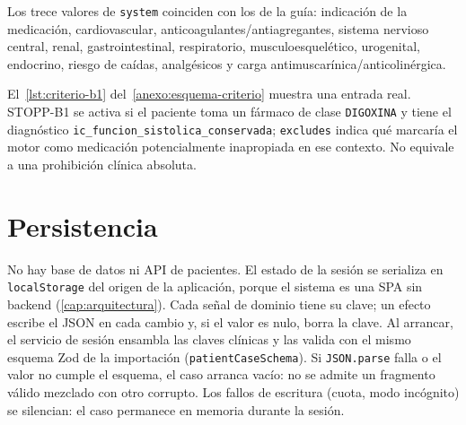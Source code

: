 Los trece valores de \texttt{system} coinciden con los de la guía: indicación
de la medicación, cardiovascular, anticoagulantes/antiagregantes, sistema
nervioso central, renal, gastrointestinal, respiratorio, musculoesquelético,
urogenital, endocrino, riesgo de caídas, analgésicos y carga
antimuscarínica/anticolinérgica.

El~\cref{lst:criterio-b1} del~\cref{anexo:esquema-criterio} muestra una
entrada real. STOPP-B1 se activa si el paciente toma un fármaco de clase
\texttt{DIGOXINA} y tiene el diagnóstico
\texttt{ic\_funcion\_sistolica\_conservada}; \texttt{excludes} indica qué
marcaría el motor como medicación potencialmente inapropiada en ese
contexto. No equivale a una prohibición clínica absoluta.

\section{Persistencia}
\label{sec:persistencia}

No hay base de datos ni API de pacientes. El estado de la sesión se serializa
en \texttt{localStorage} del origen de la aplicación, porque el sistema es
una SPA sin backend (\cref{cap:arquitectura}). Cada señal de dominio tiene
su clave; un efecto escribe el JSON en cada cambio y, si el valor es nulo,
borra la clave. Al arrancar, el servicio de sesión ensambla las claves
clínicas y las valida con el mismo esquema Zod de la importación
(\texttt{patientCaseSchema}). Si \texttt{JSON.parse} falla o el valor no
cumple el esquema, el caso arranca vacío: no se admite un fragmento
válido mezclado con otro corrupto. Los fallos de escritura (cuota, modo
incógnito) se silencian: el caso permanece en memoria durante la sesión.

